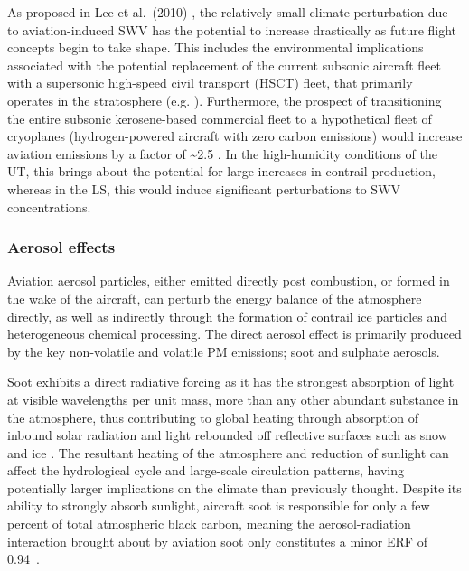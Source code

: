 As proposed in Lee et al.\ (2010) \cite{Lee2010}, the relatively small climate perturbation due to aviation-induced SWV has the potential to increase drastically as future flight concepts begin to take shape. This includes the environmental implications associated with the potential replacement of the current subsonic aircraft fleet with a supersonic high-speed civil transport (HSCT) fleet, that primarily operates in the stratosphere (e.g. \cite{MiakeLye1993, Danilin1994, Grooss1998, Kawa1999}). Furthermore, the prospect of transitioning the entire subsonic kerosene-based commercial fleet to a hypothetical fleet of cryoplanes (hydrogen-powered aircraft with zero carbon emissions) would increase aviation  emissions by a factor of \textasciitilde2.5 \cite{Gauss2003}. In the high-humidity conditions of the UT, this brings about the potential for large increases in contrail production, whereas in the LS, this would induce significant perturbations to SWV concentrations.


\subsubsection{Aerosol effects}
Aviation aerosol particles, either emitted directly post combustion, or formed in the wake of the aircraft, can perturb the energy balance of the atmosphere directly, as well as indirectly through the formation of contrail ice particles and heterogeneous chemical processing. The direct aerosol effect is primarily produced by the key non-volatile and volatile PM emissions; soot and sulphate aerosols.

Soot exhibits a direct radiative forcing as it has the strongest absorption of light at visible wavelengths per unit mass, more than any other abundant substance in the atmosphere, thus contributing to global heating through absorption of inbound solar radiation and light rebounded off reflective surfaces such as snow and ice \cite{Bond2013}. The resultant heating of the atmosphere and reduction of sunlight can affect the hydrological cycle and large-scale circulation patterns, having potentially larger implications on the climate than previously thought. Despite its ability to strongly absorb sunlight, aircraft soot is responsible for only a few percent of total atmospheric black carbon, meaning the aerosol-radiation interaction brought about by aviation soot only constitutes a minor ERF of 0.94~.

